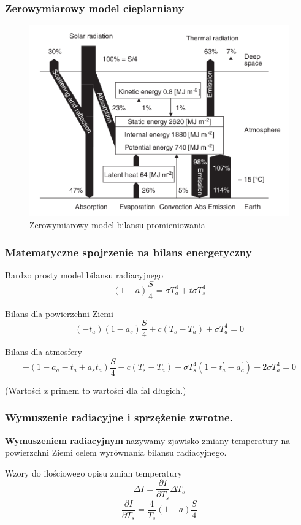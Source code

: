 \documentclass{beamer}
\begin{document}
\begin{frame}
	\frametitle{Zerowymiarowy model cieplarniany}
	\begin{figure}[h]
		\begin{center}
			\includegraphics[width=0.7\linewidth]{images/0D_Model.png}
			\caption{Zerowymiarowy model bilansu promieniowania}
		\end{center}
	\end{figure}

\end{frame}



\begin{frame}
	\frametitle{Matematyczne spojrzenie na bilans energetyczny}
	\begin{block}{Bardzo prosty model bilansu radiacyjnego}
		\[(1-a)\frac{S}{4} = \sigma T_a^4 + t\sigma T_s^4
		\]
	\end{block}
	\begin{block}{Bilans dla powierzchni Ziemi}
		\[(-t_a)(1-a_s)\frac{S}{4}+c(T_s - T_a)+\sigma T_a^4 =0
		\]
	\end{block}
	\begin{block}{Bilans dla atmosfery}
		\[-(1- a_a-t_a+a_st_a)\frac{S}{4} - c(T_s - T_a) - \sigma T_s^4
		(1-t_a^{'}-a_a^{'}) + 2\sigma T_a^4=0
		\]
	\end{block}
	\scriptsize{(Wartości z primem to wartości dla fal długich.)}
	
\end{frame}


\begin{frame}
	\frametitle{Wymuszenie radiacyjne i sprzężenie zwrotne.}
	\textbf{Wymuszeniem radiacyjnym} nazywamy zjawisko zmiany temperatury na powierzchni Ziemi celem wyrównania bilansu radiacyjnego. 
	\begin{block}{Wzory do ilościowego opisu zmian temperatury}
		\[\Delta I = \frac{\partial I}{\partial T_s}\Delta T_s
		\]
		\[\frac{\partial I}{\partial T_s} = \frac{4}{T_s}(1-a)\frac{S}{4}
		\]
		
	\end{block}
\end{frame}
\end{document}
